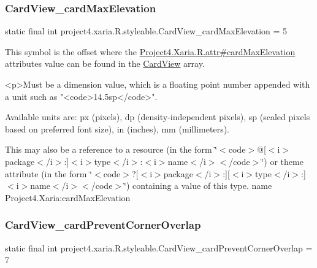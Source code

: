 \subsubsection{\texorpdfstring{Card\+View\+\_\+card\+Max\+Elevation}{CardView\_cardMaxElevation}}
{\footnotesize\ttfamily static final int project4.\+xaria.\+R.\+styleable.\+Card\+View\+\_\+card\+Max\+Elevation = 5\hspace{0.3cm}{\ttfamily [static]}}

This symbol is the offset where the \hyperlink{}{Project4.\+Xaria.\+R.\+attr\#card\+Max\+Elevation} attribute\textquotesingle{}s value can be found in the \hyperlink{classproject4_1_1xaria_1_1R_1_1styleable_abef2e3d3e2b11dd786470094dbc57ea4}{Card\+View} array.

\begin{DoxyVerb}      <p>Must be a dimension value, which is a floating point number appended with a unit such as "<code>14.5sp</code>".
\end{DoxyVerb}
 Available units are\+: px (pixels), dp (density-\/independent pixels), sp (scaled pixels based on preferred font size), in (inches), mm (millimeters). 

This may also be a reference to a resource (in the form \char`\"{}$<$code$>$@\mbox{[}$<$i$>$package$<$/i$>$\+:\mbox{]}$<$i$>$type$<$/i$>$\+:$<$i$>$name$<$/i$>$$<$/code$>$\char`\"{}) or theme attribute (in the form \char`\"{}$<$code$>$?\mbox{[}$<$i$>$package$<$/i$>$\+:\mbox{]}\mbox{[}$<$i$>$type$<$/i$>$\+:\mbox{]}$<$i$>$name$<$/i$>$$<$/code$>$\char`\"{}) containing a value of this type.  name Project4.\+Xaria\+:card\+Max\+Elevation \mbox{\label{classproject4_1_1xaria_1_1R_1_1styleable_a335e1ca3184d29fcbeeec527602ab895}} 
\subsubsection{\texorpdfstring{Card\+View\+\_\+card\+Prevent\+Corner\+Overlap}{CardView\_cardPreventCornerOverlap}}
{\footnotesize\ttfamily static final int project4.\+xaria.\+R.\+styleable.\+Card\+View\+\_\+card\+Prevent\+Corner\+Overlap = 7\hspace{0.3cm}{\ttfamily [static]}}

